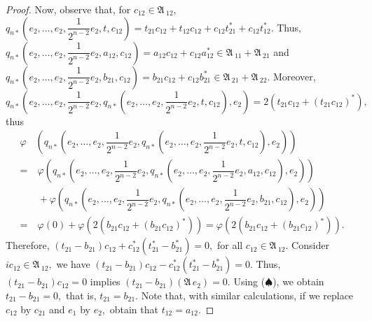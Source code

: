 \documentclass{amsart}
\def\A{{\mathfrak A}\, }
\begin{document}
\begin{proof}
Now, observe that, for $c_{12}\in \A_{12},$ $q_{n*}\left(e_2, \ldots, e_2,\dfrac{1}{2^{n-2}}e_2,t,c_{12}\right) = t_{21}c_{12}+t_{12}c_{12}+c_{12}t_{21}^*+c_{12}t_{12}^*.$ Thus, $q_{n*}\left(e_2,\ldots,e_2,\dfrac{1}{2^{n-2}}e_2,a_{12},c_{12}\right) = a_{12}c_{12}+c_{12}a_{12}^* \in \A_{11}+\A_{21}$ and $q_{n*}\left(e_2, \ldots,e_2, \dfrac{1}{2^{n-2}}e_2,b_{21},c_{12}\right)=b_{21}c_{12}+c_{12}b_{21}^* \in \A_{21}+\A_{22}.$ Moreover, 
\[q_{n*}\left(e_2, \ldots, e_2, \dfrac{1}{2^{n-2}}e_2, q_{n*}\left(e_2, \ldots, e_2,\dfrac{1}{2^{n-2}}e_2,t,c_{12}\right),e_2\right) =2(t_{21}c_{12}+(t_{21}c_{12})^*),
\]
thus 
\begin{align*}
\varphi& \left(q_{n*}\left(e_2,\ldots,e_2, \dfrac{1}{2^{n-2}}e_2,q_{n*}\left(e_2, \ldots,e_2, \dfrac{1}{2^{n-2}}e_2,t,c_{12}\right),e_2\right)\right) \\
=& \ \varphi\left(q_{n*}\left(e_2,\ldots,e_2,\dfrac{1}{2^{n-2}}e_2,q_{n*}\left(e_2, \ldots,e_2,\dfrac{1}{2^{n-2}}e_2,a_{12},c_{12}\right),e_2\right)\right)\\
& \ +\varphi\left(q_{n*}\left(e_2,\ldots,e_2,\dfrac{1}{2^{n-2}}e_2,q_{n*}\left(e_2, \ldots,e_2,\dfrac{1}{2^{n-2}}e_2,b_{21},c_{12}\right),e_2\right)\right) \\
=& \ \varphi(0) + \varphi(2(b_{21}c_{12}+(b_{21}c_{12})^*))=\varphi(2(b_{21}c_{12}+(b_{21}c_{12})^*)).
\end{align*}
Therefore, $(t_{21}-b_{21})c_{12}+c_{12}^*(t_{21}^*-b_{21}^*)=0,$ for all $c_{12}\in \A_{12}.$ Consider $ic_{12}\in \A_{12},$ we have $(t_{21}-b_{21})c_{12}-c_{12}^*(t_{21}^*-b_{21}^*)=0.$ Thus, $(t_{21}-b_{21})c_{12}=0$ implies $(t_{21}-b_{21})(\A e_2) = 0.$ Using ($\spadesuit$), we obtain $t_{21}-b_{21}=0,$ that is, $t_{21}=b_{21}.$ Note that, with similar calculations, if we replace $c_{12}$ by $c_{21}$ and $e_1$ by $e_2,$ obtain that $t_{12} = a_{12}.$

\end{proof}
\end{document}
